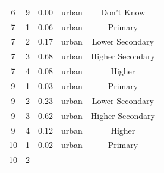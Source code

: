 \documentclass[stu, 12pt, floatsintext,longtable]{apa7}
\begin{document}
\begin{longtable}{ccccc}
    6                                                  & 9                    &
    0.00                                               &
    urban                                              & Don't Know
    \\
    7                                                  & 1                    &
    0.06                                               &
    urban                                              & Primary
    \\
    7                                                  & 2                    &
    0.17                                               &
    urban                                              & Lower Secondary
    \\
    7                                                  & 3                    &
    0.68                                               &
    urban                                              & Higher Secondary
    \\
    7                                                  & 4                    &
    0.08                                               &
    urban                                              & Higher
    \\
    9                                                  & 1                    &
    0.03                                               &
    urban                                              & Primary
    \\
    9                                                  & 2                    &
    0.23                                               &
    urban                                              & Lower Secondary
    \\
    9                                                  & 3                    &
    0.62                                               &
    urban                                              & Higher Secondary
    \\
    9                                                  & 4                    &
    0.12                                               &
    urban                                              & Higher
    \\
    10                                                 & 1                    &
    0.02                                               &
    urban                                              & Primary
    \\
    10                                                 & 2                    &

\end{longtable}
\end{document}
